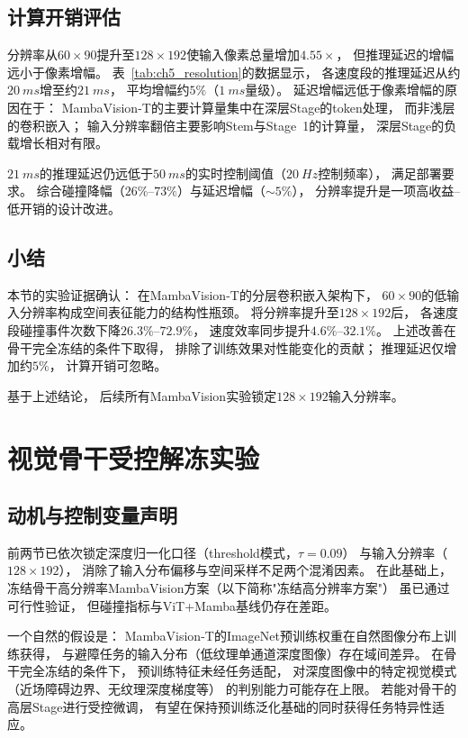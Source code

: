 \subsection{计算开销评估}

分辨率从$60\times90$提升至$128\times192$使输入像素总量增加$4.55\times$，
但推理延迟的增幅远小于像素增幅。
表~\ref{tab:ch5_resolution}的数据显示，
各速度段的推理延迟从约$\SI{20}{ms}$增至约$\SI{21}{ms}$，
平均增幅约$5\%$（$\SI{1}{ms}$量级）。
延迟增幅远低于像素增幅的原因在于：
MambaVision-T的主要计算量集中在深层Stage的token处理，
而非浅层的卷积嵌入；
输入分辨率翻倍主要影响Stem与Stage~1的计算量，
深层Stage的负载增长相对有限。

$\SI{21}{ms}$的推理延迟仍远低于$\SI{50}{ms}$的实时控制阈值（$\SI{20}{Hz}$控制频率），
满足部署要求。
综合碰撞降幅（$26\%$--$73\%$）与延迟增幅（$\sim5\%$），
分辨率提升是一项高收益--低开销的设计改进。

\subsection{小结}

本节的实验证据确认：
在MambaVision-T的分层卷积嵌入架构下，
$60\times90$的低输入分辨率构成空间表征能力的结构性瓶颈。
将分辨率提升至$128\times192$后，
各速度段碰撞事件次数下降$26.3\%$--$72.9\%$，
速度效率同步提升$4.6\%$--$32.1\%$。
上述改善在骨干完全冻结的条件下取得，
排除了训练效果对性能变化的贡献；
推理延迟仅增加约$5\%$，
计算开销可忽略。

基于上述结论，
后续所有MambaVision实验锁定$128\times192$输入分辨率。

\FloatBarrier


\section{视觉骨干受控解冻实验}
\label{sec:ch5_unfreeze}

\subsection{动机与控制变量声明}

前两节已依次锁定深度归一化口径（threshold模式，$\tau=0.09$）
与输入分辨率（$128\times192$），
消除了输入分布偏移与空间采样不足两个混淆因素。
在此基础上，
冻结骨干高分辨率MambaVision方案（以下简称"冻结高分辨率方案"）
虽已通过可行性验证，
但碰撞指标与ViT+Mamba基线仍存在差距。

一个自然的假设是：
MambaVision-T的ImageNet预训练权重在自然图像分布上训练获得，
与避障任务的输入分布（低纹理单通道深度图像）存在域间差异。
在骨干完全冻结的条件下，
预训练特征未经任务适配，
对深度图像中的特定视觉模式（近场障碍边界、无纹理深度梯度等）
的判别能力可能存在上限。
若能对骨干的高层Stage进行受控微调，
有望在保持预训练泛化基础的同时获得任务特异性适应。

